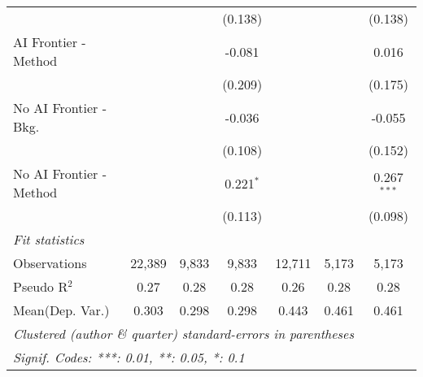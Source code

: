\begin{tabular}{lcccccc}
                           &               &               & (0.138)       &               &               & (0.138)\\   
   AI Frontier - Method    &               &               & -0.081        &               &               & 0.016\\   
                           &               &               & (0.209)       &               &               & (0.175)\\   
   No AI Frontier - Bkg.   &               &               & -0.036        &               &               & -0.055\\   
                           &               &               & (0.108)       &               &               & (0.152)\\   
   No AI Frontier - Method &               &               & 0.221$^{*}$   &               &               & 0.267$^{***}$\\   
                           &               &               & (0.113)       &               &               & (0.098)\\   
   \midrule
   \emph{Fit statistics}\\
   Observations            & 22,389        & 9,833         & 9,833         & 12,711        & 5,173         & 5,173\\  
   Pseudo R$^2$            & 0.27          & 0.28          & 0.28          & 0.26          & 0.28          & 0.28\\  
Mean(Dep. Var.) & 0.303 & 0.298 & 0.298 & 0.443 & 0.461 & 0.461 \\
   \midrule \midrule
   \multicolumn{7}{l}{\emph{Clustered (author \& quarter) standard-errors in parentheses}}\\
   \multicolumn{7}{l}{\emph{Signif. Codes: ***: 0.01, **: 0.05, *: 0.1}}\\
\end{tabular}
\par\endgroup
